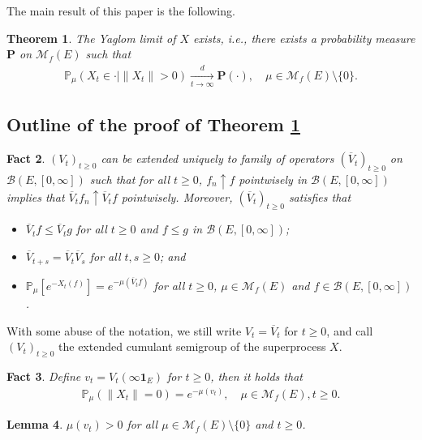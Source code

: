 \documentclass[12pt,a4paper]{amsart}
\numberwithin{equation}{section}
\theoremstyle{plain}
\newtheorem{thm}{Theorem}[section]
\newtheorem{lem}[thm]{Lemma}
\newtheorem{fact}[thm]{Fact}
\theoremstyle{definition}
\theoremstyle{remark}
\newcounter{N}
\newcounter{n}[N]
\begin{document}
	The main result of this paper is the following.
\begin{thm} \label{Theorem:Y:H1:H2:H3:H4}
	The Yaglom limit of $X$ exists, i.e., there exists a probability measure $\mathbf P$ on $\mathcal M_f(E)$ such that
\begin{align}
 	\mathbb P_\mu (X_t \in \cdot | \|X_t\|> 0 )
 	\xrightarrow[t\to \infty]{d} \mathbf P(\cdot),
 	\quad \mu \in \mathcal M_f(E)\setminus \{0\}.
\end{align}
\end{thm}
\subsection{Outline of the proof of Theorem \ref{Theorem:Y:H1:H2:H3:H4}}
	\label{subsec:OY}
\begin{fact} \label{Fact:BV!}
$(V_t)_{t\geq 0}$ can be extended uniquely to family of operators $(\overline V_t)_{t\geq 0}$
	on $\mathcal B(E,[0,\infty])$ such that for all $t\geq 0$, $f_n \uparrow f$ pointwisely in  
	$\mathcal B(E, [0,\infty])$ implies that $\overline V_tf_n \uparrow \overline V_tf$ pointwisely.
Moreover, $(\overline V_t)_{t\geq 0}$ satisfies that
\begin{itemize}
\item
$\overline V_t f \leq \overline V_t g$ for all $t\geq 0$ and $f\leq g$ in $\mathcal B(E,[0,\infty])$;
\item
$\overline V_{t+s} = \overline V_t \overline V_s$ for all $t, s\geq 0$;  and
\item
$\mathbb P_\mu [e^{-X_t(f)}] = e^{- \mu(\overline V_tf)}$ for all 
$t\geq 0$, $\mu \in \mathcal M_f(E)$ and $f\in \mathcal B(E,[0,\infty])$.
\end{itemize}
\end{fact}
With some abuse of the notation, we still write $V_t = \overline V_t$ for $t\geq 0$, and call $(V_t)_{t\geq 0}$ the extended cumulant semigroup of the superprocess $X$.
\begin{fact} \label{Fact:sv1!}
Define $v_t = V_t(\infty\mathbf 1_E)$ for $t\geq 0$, then it holds that
\begin{align}
\mathbb P_\mu (\|X_t\| = 0)
= e^{- \mu (v_t)},
\quad \mu \in \mathcal M_f(E), t\geq 0.
\end{align}
\end{fact}
\begin{lem} \label{Lemma:sv2!}
$\mu(v_t) > 0$ for all $\mu \in \mathcal M_f(E)\setminus\{0\}$ and $t \geq 0$.
\end{lem}
\end{document}
